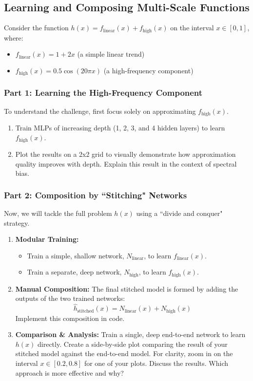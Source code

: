 \documentclass[11pt]{article}
\begin{document}
\subsection{Learning and Composing Multi-Scale Functions}
Consider the function $h(x) = f_{\text{linear}}(x) + f_{\text{high}}(x)$ on the interval $x \in [0,1]$, where:
\begin{itemize}
    \item $f_{\text{linear}}(x) = 1 + 2x$ (a simple linear trend)
    \item $f_{\text{high}}(x) = 0.5 \cos(20\pi x)$ (a high-frequency component)
\end{itemize}

\subsubsection*{Part 1: Learning the High-Frequency Component}
To understand the challenge, first focus solely on approximating $f_{\text{high}}(x)$.
\begin{enumerate}
    \item[\textbf{a)}] Train MLPs of increasing depth (1, 2, 3, and 4 hidden layers) to learn $f_{\text{high}}(x)$.
    \item[\textbf{b)}] Plot the results on a 2x2 grid to visually demonstrate how approximation quality improves with depth. Explain this result in the context of spectral bias.
\end{enumerate}

\subsubsection*{Part 2: Composition by ``Stitching" Networks}
Now, we will tackle the full problem $h(x)$ using a ``divide and conquer" strategy.
\begin{enumerate}
    \item[\textbf{a)}] \textbf{Modular Training:}
        \begin{itemize}
            \item Train a simple, shallow network, $N_{\text{linear}}$, to learn $f_{\text{linear}}(x)$.
            \item Train a separate, deep network, $N_{\text{high}}$, to learn $f_{\text{high}}(x)$.
        \end{itemize}
    \item[\textbf{b)}] \textbf{Manual Composition:} The final stitched model is formed by adding the outputs of the two trained networks:
    \[ \hat{h}_{\text{stitched}}(x) = N_{\text{linear}}(x) + N_{\text{high}}(x) \]
    Implement this composition in code.
    \item[\textbf{c)}] \textbf{Comparison \& Analysis:} Train a single, deep end-to-end network to learn $h(x)$ directly. Create a side-by-side plot comparing the result of your stitched model against the end-to-end model. For clarity, zoom in on the interval $x \in [0.2, 0.8]$ for one of your plots. Discuss the results. Which approach is more effective and why?
\end{enumerate}
\end{document}
